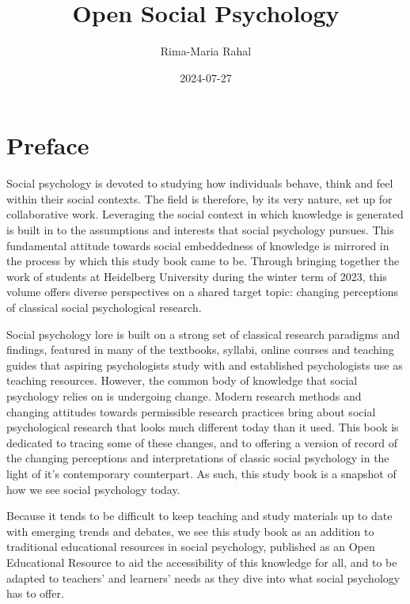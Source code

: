 \documentclass[
  letterpaper,
]{book}
\title{Open Social Psychology}
\author{Rima-Maria Rahal}
\date{2024-07-27}
\renewcommand*\contentsname{Table of contents}
\newcommand\contentsname{Table of contents}
\begin{document}
\frontmatter
\maketitle

\renewcommand*\contentsname{Table of contents}
{
\hypersetup{linkcolor=}
\setcounter{tocdepth}{2}
\tableofcontents
}
\mainmatter
{}

\chapter*{\texorpdfstring{{Preface}}{Preface}}\label{preface}


Social psychology is devoted to studying how individuals behave, think
and feel within their social contexts. The field is therefore, by its
very nature, set up for collaborative work. Leveraging the social
context in which knowledge is generated is built in to the assumptions
and interests that social psychology pursues. This fundamental attitude
towards social embeddedness of knowledge is mirrored in the process by
which this study book came to be. Through bringing together the work of
students at Heidelberg University during the winter term of 2023, this
volume offers diverse perspectives on a shared target topic: changing
perceptions of classical social psychological research.

Social psychology lore is built on a strong set of classical research
paradigms and findings, featured in many of the textbooks, syllabi,
online courses and teaching guides that aspiring psychologists study
with and established psychologists use as teaching resources. However,
the common body of knowledge that social psychology relies on is
undergoing change. Modern research methods and changing attitudes
towards permissible research practices bring about social psychological
research that looks much different today than it used. This book is
dedicated to tracing some of these changes, and to offering a version of
record of the changing perceptions and interpretations of classic social
psychology in the light of it's contemporary counterpart. As such, this
study book is a snapshot of how we see social psychology today.

Because it tends to be difficult to keep teaching and study materials up
to date with emerging trends and debates, we see this study book as an
addition to traditional educational resources in social psychology,
published as an Open Educational Resource to aid the accessibility of
this knowledge for all, and to be adapted to teachers' and learners'
needs as they dive into what social psychology has to offer.
\end{document}
